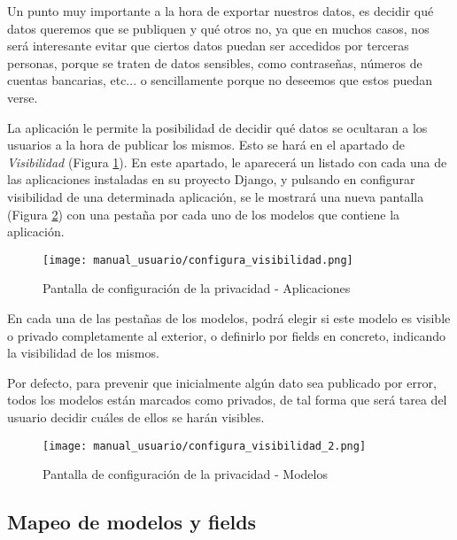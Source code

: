 Un punto muy importante a la hora de exportar nuestros datos, es decidir qué
datos queremos que se publiquen y qué otros no, ya que en muchos casos, nos será
interesante evitar que ciertos datos puedan ser accedidos por terceras personas,
porque se traten de datos sensibles, como contraseñas, números de cuentas
bancarias, etc... o sencillamente porque no deseemos que estos puedan verse.

La aplicación le permite la posibilidad de decidir qué datos se ocultaran a los
usuarios a la hora de publicar los mismos. Esto se hará en el apartado de
\textit{Visibilidad} (Figura \ref{fig:configura_visibilidad}). En este apartado,
le aparecerá un listado con cada una de las aplicaciones instaladas en su
proyecto Django, y pulsando en configurar visibilidad de una determinada
aplicación, se le mostrará una nueva pantalla (Figura
\ref{fig:configura_visibilidad_2}) con una pestaña por cada uno de los modelos
que contiene la aplicación.

\begin{figure}[H]
    \begin{center}
        \texttt{[image: manual\_usuario/configura\_visibilidad.png]}
    \end{center}
    \caption{Pantalla de configuración de la privacidad - Aplicaciones}
    \label{fig:configura_visibilidad}
\end{figure}

En cada una de las pestañas de los modelos, podrá elegir si este modelo es
visible o privado completamente al exterior, o definirlo por fields en concreto,
indicando la visibilidad de los mismos.

Por defecto, para prevenir que inicialmente algún dato sea publicado por error,
todos los modelos están marcados como privados, de tal forma que será tarea del
usuario decidir cuáles de ellos se harán visibles.

\newpage

\begin{figure}[H]
    \begin{center}
        \texttt{[image: manual\_usuario/configura\_visibilidad\_2.png]}
    \end{center}
    \caption{Pantalla de configuración de la privacidad - Modelos}
    \label{fig:configura_visibilidad_2}
\end{figure}

\subsection{Mapeo de modelos y fields}

